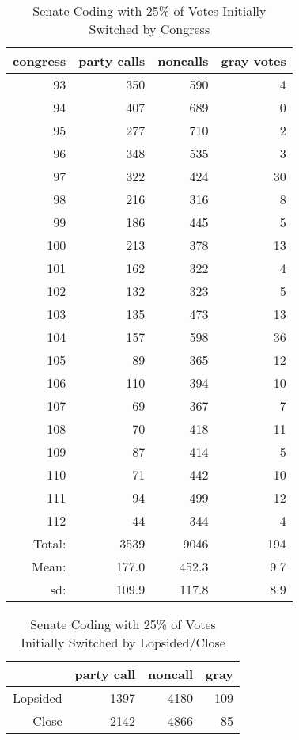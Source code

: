 \documentclass[12pt]{article}
\begin{document}
\begin{table}[ht]
	\centering
	\caption{Senate Coding with 25\% of Votes Initially Switched by Congress}
	\begin{tabular}{rrrr}
		\hline
		congress & party calls & noncalls & gray votes \\ 
		\hline
		93 & 350 & 590 &   4 \\ 
		94 & 407 & 689 &   0 \\ 
		95 & 277 & 710 &   2 \\ 
		96 & 348 & 535 &   3 \\ 
		97 & 322 & 424 &  30 \\ 
		98 & 216 & 316 &   8 \\ 
		99 & 186 & 445 &   5 \\ 
		100 & 213 & 378 &  13 \\ 
		101 & 162 & 322 &   4 \\ 
		102 & 132 & 323 &   5 \\ 
		103 & 135 & 473 &  13 \\ 
		104 & 157 & 598 &  36 \\ 
		105 &  89 & 365 &  12 \\ 
		106 & 110 & 394 &  10 \\ 
		107 &  69 & 367 &   7 \\ 
		108 &  70 & 418 &  11 \\ 
		109 &  87 & 414 &   5 \\ 
		110 &  71 & 442 &  10 \\ 
		111 &  94 & 499 &  12 \\ 
		112 &  44 & 344 &   4 \\ 
		\hline
		Total: & 3539 & 9046 & 194 \\
		Mean: & 177.0 & 452.3 & 9.7 \\
		sd: & 109.9 & 117.8 & 8.9 \\
		\hline
	\end{tabular}
\end{table}

\begin{table}[ht]
	\centering
		\caption{Senate Coding with 25\% of Votes Initially Switched by Lopsided/Close}
	\begin{tabular}{rrrr}
		\hline
		& party call  & noncall & gray \\ 
		\hline
		Lopsided & 1397 & 4180 & 109 \\ 
		Close & 2142 & 4866 & 85 \\ 
		\hline
	\end{tabular}
\end{table}
\end{document}
